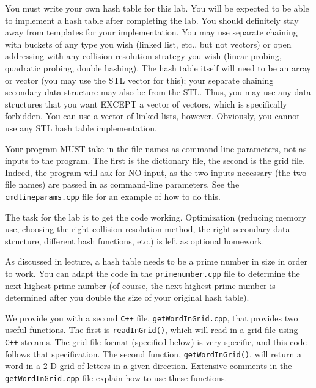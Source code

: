 \documentclass[11pt]{article}
\begin{document}
You must write your own hash table for this lab. You will be expected to be able to implement a hash table after completing the lab. You should definitely stay away from templates for your implementation. You may use separate chaining with buckets of any type you wish (linked list, etc., but not vectors) or open addressing with any collision resolution strategy you wish (linear probing, quadratic probing, double hashing). The hash table itself will need to be an array or vector (you may use the STL vector for this); your separate chaining secondary data structure may also be from the STL. Thus, you may use any data structures that you want EXCEPT a vector of vectors, which is specifically forbidden. You can use a vector of linked lists, however. Obviously, you cannot use any STL hash table implementation.

Your program MUST take in the file names as command-line parameters, not as inputs to the program. The first is the dictionary file, the second is the grid file. Indeed, the program will ask for NO input, as the two inputs necessary (the two file names) are passed in as command-line parameters. See the \texttt{cmdlineparams.cpp} file for an example of how to do this.

The task for the lab is to get the code working. Optimization (reducing memory use, choosing the right collision resolution method, the right secondary data structure, different hash functions, etc.) is left as optional homework. 

As discussed in lecture, a hash table needs to be a prime number in size in order to work. You can adapt the code in the \texttt{primenumber.cpp} file to determine the next highest prime number (of course, the next highest prime number is determined after you double the size of your original hash table).

We provide you with a second \texttt{C++} file, \texttt{getWordInGrid.cpp}, that provides two useful functions. The first is \texttt{readInGrid()}, which will read in a grid file using \texttt{C++} streams. The grid file format (specified below) is very specific, and this code follows that specification. The second function, \texttt{getWordInGrid()}, will return a word in a 2-D grid of letters in a given direction. Extensive comments in the \texttt{getWordInGrid.cpp} file explain how to use these functions. 
\end{document}
